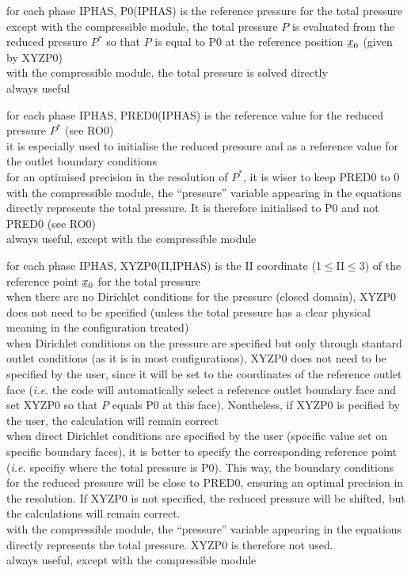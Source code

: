 {for each phase IPHAS, P0(IPHAS) is the reference pressure for the total
pressure\\
except with the compressible module, the total pressure $P$ is evaluated
from the reduced pressure $P^*$ so that $P$
is equal to P0 at the reference position $\underline{x}_0$ (given by XYZP0)\\
with the compressible module, the total pressure is solved directly\\
always useful}

{for each phase IPHAS, PRED0(IPHAS) is the reference value for the reduced
pressure $P^*$ (see RO0)\\
it is especially used to initialise the reduced pressure and as a reference
value for the outlet boundary conditions\\
for an optimised precision in the resolution of $P^*$, it is wiser to keep PRED0
to 0\\
with the compressible module, the ``pressure'' variable appearing in the
equations directly represents the total pressure. It is therefore initialised
to P0 and not PRED0 (see RO0)\\
always useful, except with the compressible module}

{for each phase IPHAS, XYZP0(II,IPHAS) is the II coordinate
(1$\leqslant$II$\leqslant$3) of the reference point $\underline{x}_0$ for the
total pressure\\ 
when there are no Dirichlet conditions for the pressure (closed domain), XYZP0
does not need to be specified (unless the total pressure has a clear physical
meaning in the configuration treated)\\
when Dirichlet conditions on the pressure are specified but only through stantard
outlet conditions (as it is in most configurations),
XYZP0 does not need to be specified by the user, since it will be set to the
coordinates of the reference outlet face ({\em i.e.} the code will automatically
select a 
reference outlet boundary face and set XYZP0 so that $P$ equals P0 at this
face). Nontheless, if XYZP0 is pecified by the user, the calculation will remain
correct\\
when direct Dirichlet conditions are specified by the user (specific value set
on specific boundary faces), it is better to specify the corresponding reference
point ({\em i.e.} specifiy where the total pressure is P0). This way, the
boundary conditions for the reduced pressure will be close to PRED0, ensuring an
optimal precision in the resolution. If XYZP0 is not specified, the reduced
pressure will be shifted, but the calculations will remain correct.\\
with the compressible module, the ``pressure'' variable appearing in the
equations directly represents the total pressure. XYZP0 is therefore not used.\\
always useful, except with the compressible module}


